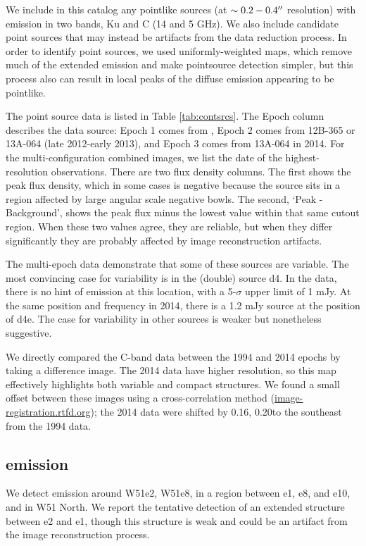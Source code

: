 

We include in this catalog any pointlike sources (at $\sim0.2-0.4\mbox{$^{\prime\prime}$}$
resolution) with emission in two bands, Ku and C (14 and 5 GHz).  We also
include candidate point sources that may instead be artifacts from the data
reduction process.  In order to identify point sources, we used
uniformly-weighted maps, which remove much of the extended emission and make
pointsource detection simpler, but this process also can result in local peaks
of the diffuse emission appearing to be pointlike.

The point source data is listed in Table \ref{tab:contsrcs}.  The Epoch column
describes the data source: Epoch 1 comes from \citet{Mehringer1994a}, Epoch 2
comes from 12B-365 or 13A-064 (late 2012-early 2013), and Epoch 3 comes from
13A-064 in 2014. For the multi-configuration combined images, we list the date
of the highest-resolution observations.  There are two flux density
columns.  The first shows the peak flux density, which in some
cases is negative because the source sits in a region affected by large angular
scale negative bowls.  The second, `Peak - Background', shows the peak flux
minus the lowest value within that same cutout region.  When these two values
agree, they are reliable, but when they differ significantly they are probably
affected by image reconstruction artifacts.



The multi-epoch data demonstrate that some of these sources are variable.  The
most convincing case for variability is in the (double) source d4.  In the
\citet{Mehringer1994a} data, there is no hint of emission at this location,
with a 5-$\sigma$ upper limit of 1 mJy.  At the same position and frequency in
2014, there is a 1.2 mJy source at the position of d4e.  The case for
variability in other sources is weaker but nonetheless suggestive.

We directly compared the C-band data between the 1994 and 2014 epochs by taking
a difference image.  The 2014 data have higher resolution, so this map
effectively highlights both variable and compact structures.  We found a small
offset between these images using a cross-correlation method
(\url{image-registration.rtfd.org}); the 2014 data were shifted by 0.16\arcsec,
0.20\arcsec to the southeast from the 1994 data.


\subsection{\formaldehyde \twotwo emission}
\label{sec:twotwoemission}
We detect \formaldehyde \twotwo emission around W51e2, W51e8, in a region
between e1, e8, and e10, and in W51 North.  We report the tentative detection
of an extended structure between e2 and e1, though this structure is weak
and could be an artifact from the image reconstruction process.

